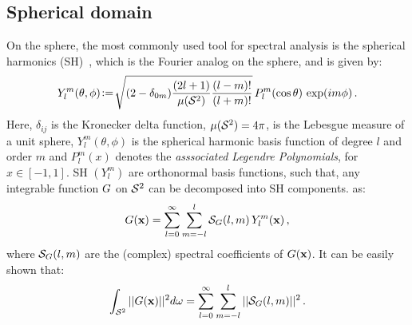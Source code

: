 %
%
%
\subsection{Spherical domain}

On the sphere, the most commonly used tool for spectral analysis is the spherical harmonics
(SH)~\cite{Groemer1996}, which is the Fourier analog on the sphere, and is given by:
%
\begin{equation}
\label{eq:SH}
Y_l^m(\theta,\phi) \!\mathrel{\mathop:}=\! {\sqrt{(2-\delta_{0m})\frac{(2l+1)}{{\mu({\mathcal{S}^{2}})}}\frac{(l-m)!}{(l+m)!}}} \, P_l^m(\cos\theta) \, \exp({im\phi})\,.
\end{equation}
%
Here, $\delta_{ij}$ is the Kronecker delta function, ${\mu({\mathcal{S}^{2}})}=4\pi$, is the Lebesgue measure of a unit 
sphere, $Y_l^m(\theta,\phi)$ is the spherical harmonic basis
function of degree $l$ and order $m$ and $P_l^m(x)$ denotes  the \emph{asssociated Legendre
Polynomials}, for $x \in [-1,1]$. SH $(Y_l^m)$ are orthonormal basis functions, such that,  any integrable function
${G}$ on ${\mathcal{S}^{2}}$ can be decomposed into SH components.
 as:
\begin{align}
\label{eq:SHDecomposition}
{G}(\mathbf{x}) = \sum_{l=0}^{\infty} \sum_{m=-l}^{l}  \mathcal{S}_{{G}}(l,m) \, Y_l^m(\mathbf{x})\,,
\end{align}
%
where $\mathcal{S}_{{G}}(l,m)$ are the (complex) spectral coefficients of ${G}(\mathbf{x})$. 
It can be easily shown that:
%
\begin{equation}
\int_{{\mathcal{S}^{2}}} ||{G}(\mathbf{x})||^2 d\omega = \sum_{l=0}^{\infty} \sum_{m=-l}^{l} ||\mathcal{S}_{{G}}(l,m)||^2\,.
\end{equation}

